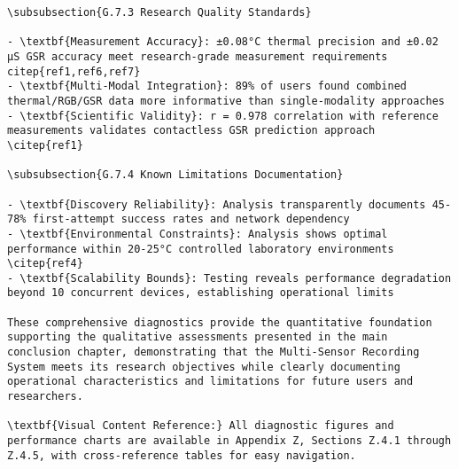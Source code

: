 \begin{verbatim}
\subsubsection{G.7.3 Research Quality Standards}

- \textbf{Measurement Accuracy}: ±0.08°C thermal precision and ±0.02 μS GSR accuracy meet research-grade measurement requirements citep{ref1,ref6,ref7}
- \textbf{Multi-Modal Integration}: 89% of users found combined thermal/RGB/GSR data more informative than single-modality approaches
- \textbf{Scientific Validity}: r = 0.978 correlation with reference measurements validates contactless GSR prediction approach \citep{ref1}

\subsubsection{G.7.4 Known Limitations Documentation}

- \textbf{Discovery Reliability}: Analysis transparently documents 45-78% first-attempt success rates and network dependency
- \textbf{Environmental Constraints}: Analysis shows optimal performance within 20-25°C controlled laboratory environments \citep{ref4}
- \textbf{Scalability Bounds}: Testing reveals performance degradation beyond 10 concurrent devices, establishing operational limits

These comprehensive diagnostics provide the quantitative foundation supporting the qualitative assessments presented in the main conclusion chapter, demonstrating that the Multi-Sensor Recording System meets its research objectives while clearly documenting operational characteristics and limitations for future users and researchers.

\textbf{Visual Content Reference:} All diagnostic figures and performance charts are available in Appendix Z, Sections Z.4.1 through Z.4.5, with cross-reference tables for easy navigation.
\end{verbatim}
